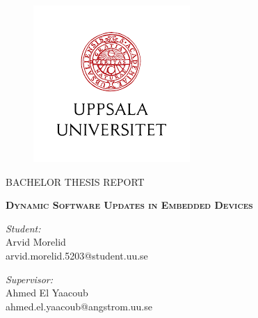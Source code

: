 
\begin{titlepage}

\begin{figure}
    \begin{center}
        \includegraphics[scale=0.5]{img/UU_LOGO.png}
    \end{center}
\end{figure}

\thispagestyle{fancy}

\vspace{1in}

\center

\textsc{\large BACHELOR THESIS REPORT} %

\vspace{0.5in}

\noindent\makebox[\linewidth]{\rule{\linewidth}{1.2pt}}
\textsc{ \textbf{\large 
Dynamic Software Updates in Embedded Devices
}}
\noindent\makebox[\linewidth]{\rule{\linewidth}{1.2pt}}

\vspace{0.5in}

\begin{minipage}{0.48\textwidth}
    \begin{flushleft}
        \textit{Student:} \\
        Arvid Morelid    \\
        arvid.morelid.5203@student.uu.se \\
    \end{flushleft}
\end{minipage}
\begin{minipage}{0.48\textwidth}
    \begin{flushright}
    \textit{Supervisor:} \\
    Ahmed El Yaacoub \\
    ahmed.el.yaacoub@angstrom.uu.se   \\
    \end{flushright}
\end{minipage}


\end{titlepage}
